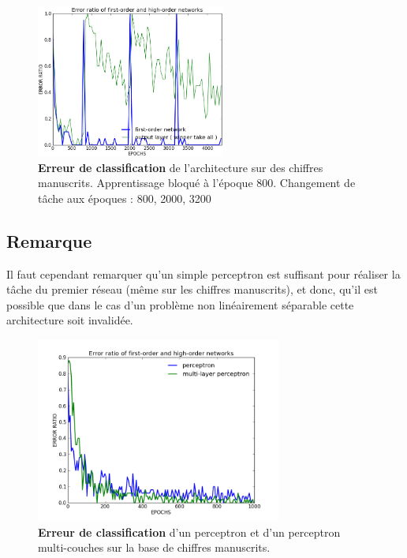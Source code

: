 \documentclass[a4paper,12pt, twoside]{article}
\begin{document}
\begin{figure}[H]
\begin{center}
 \includegraphics[height=190px]{../cleeremans_2007/digit_reco/err_handwritten_relearn_2.png}
\end{center}
\caption{ \textbf{Erreur de classification} de l'architecture sur des chiffres manuscrits.
Apprentissage bloqué à l'époque 800. Changement de tâche aux époques : 800, 2000, 3200}
\end{figure}

\subsection{Remarque}

Il faut cependant remarquer qu'un simple perceptron est suffisant pour réaliser la tâche
du premier réseau (même sur les chiffres manuscrits), et donc, qu'il est possible que 
dans le cas d'un problème non linéairement séparable cette architecture soit invalidée.
 
\begin{figure}[H]
\begin{center}
 \includegraphics[height=230px]{../cleeremans_2007/digit_reco/p_vs_mlp.png}
\end{center}
\caption{ \textbf{Erreur de classification} d'un perceptron et d'un perceptron multi-couches
sur la base de chiffres manuscrits.}
\end{figure}
\end{document}
